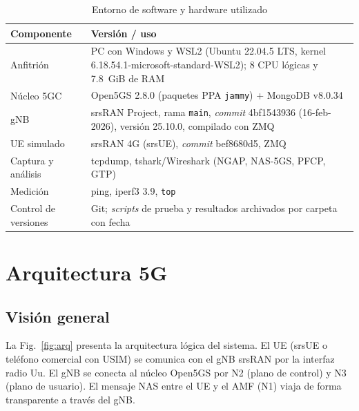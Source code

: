 \documentclass[conference]{IEEEtran}
\begin{document}
\begin{table}[!t]
\caption{Entorno de software y hardware utilizado}
\label{tab:entorno}
\centering
\footnotesize
\renewcommand{\arraystretch}{1.15}
\begin{tabular}{p{2.2cm}p{5.6cm}}
\toprule
\textbf{Componente} & \textbf{Versión / uso} \\
\midrule
Anfitrión & PC con Windows y WSL2 (Ubuntu 22.04.5 LTS, kernel 6.18.54.1-microsoft-standard-WSL2); 8 CPU lógicas y 7.8~GiB de RAM \\
Núcleo 5GC & Open5GS 2.8.0 (paquetes PPA \texttt{jammy}) + MongoDB v8.0.34 \\
gNB & srsRAN Project, rama \texttt{main}, \textit{commit} 4bf1543936 (16-feb-2026), versión 25.10.0, compilado con ZMQ \\
UE simulado & srsRAN 4G (srsUE), \textit{commit} bef8680d5, ZMQ \\
Captura y análisis & tcpdump, tshark/Wireshark (NGAP, NAS-5GS, PFCP, GTP) \\
Medición & ping, iperf3 3.9, \texttt{top} \\
Control de versiones & Git; \textit{scripts} de prueba y resultados archivados por carpeta con fecha \\
\bottomrule
\end{tabular}
\end{table}

\section{Arquitectura 5G}
\label{sec:arq}

\subsection{Visión general}
La Fig.~\ref{fig:arq} presenta la arquitectura lógica del sistema. El UE (srsUE o teléfono comercial con USIM) se comunica con el gNB srsRAN por la interfaz radio Uu. El gNB se conecta al núcleo Open5GS por N2 (plano de control) y N3 (plano de usuario). El mensaje NAS entre el UE y el AMF (N1) viaja de forma transparente a través del gNB.
\end{document}

